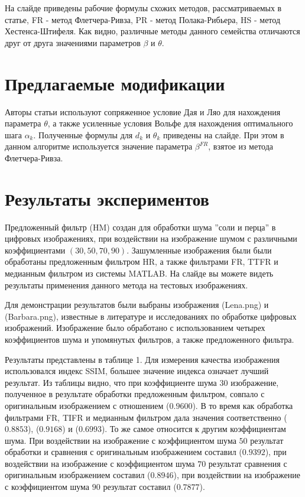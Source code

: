 На слайде приведены рабочие формулы схожих методов, рассматриваемых в статье, FR
- метод Флетчера-Ривза, PR - метод Полака-Рибьера, HS - метод
Хестенса-Штифеля. Как видно, различные методы данного семейства отличаются друг
от друга значениями параметров $\beta$ и $\theta$.

\section{Предлагаемые модификации}

Авторы статьи используют сопряженное условие Дая и Ляо для нахождения параметра
$\theta$, а также усиленные условия Вольфе для нахождения оптимального шага
$\alpha_{k}$. Полученные формулы для $d_{k}$ и $\theta_{k}$ приведены на слайде.
При этом в данном алгоритме используется значение параметра $\beta^{FR}$, взятое
из метода Флетчера-Ривза.

\section{Результаты экспериментов}

Предложенный фильтр (HM) создан для обработки шума ''соли и перца'' в цифровых
изображениях, при воздействии на изображение шумом с различными коэффициентами
$\left(30,50,70,90\right)$. Зашумленные изображения были были обработаны
предложенным фильтром HR, а также фильтрами FR, TTFR и медианным фильтром из
системы MATLAB. На слайде вы можете видеть результаты применения данного метода
на тестовых изображениях.

Для демонстрации результатов были выбраны изображения (Lena.png) и
(Barbara.png), известные в литературе и исследованиях по обработке цифровых
изображений. Изображение было обработано с использованием четырех коэффициентов
шума и упомянутых фильтров, а также предложенного фильтра.

Результаты представлены в таблице 1. Для измерения качества изображения
использовался индекс SSIM, большее значение индекса означает лучший результат.
Из таблицы видно, что при коэффициенте шума $30$ изображение, полученное в
результате обработки предложенным фильтром, совпало с оригинальным изображением
с отношением ($0.9600$). В то время как обработка фильтрами FR, TIFR и медианным
фильтром дала значения соответственно ($0.8853$), ($0.9168$) и ($0.6993$). То же
самое относится к другим коэффициентам шума. При воздействии на изображение с
коэффициентом шума $50$ результат обработки и сравнения с оригинальным
изображением составил ($0.9392$), при воздействии на изображение с коэффициентом
шума $70$ результат сравнения с оригинальным изображением составил ($0.8946$),
при воздействии на изображение с коэффициентом шума $90$ результат составил
($0.7877$).

